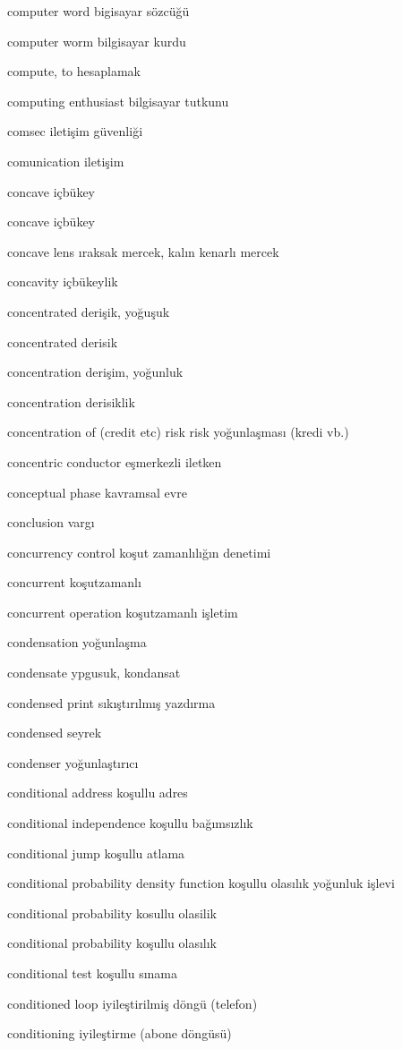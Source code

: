 \documentclass[12pt,fleqn]{article}\usepackage{../../common}
\begin{document}
computer word bigisayar sözcüğü

computer worm bilgisayar kurdu

compute, to hesaplamak

computing enthusiast bilgisayar tutkunu

comsec iletişim güvenliği

comunication iletişim

concave içbükey

concave içbükey

concave lens ıraksak mercek, kalın kenarlı mercek

concavity içbükeylik

concentrated derişik, yoğuşuk

concentrated derisik

concentration derişim, yoğunluk

concentration derisiklik

concentration of (credit etc) risk risk yoğunlaşması (kredi vb.)

concentric conductor eşmerkezli iletken

conceptual phase kavramsal evre

conclusion vargı

concurrency control koşut zamanlılığın denetimi

concurrent koşutzamanlı

concurrent operation koşutzamanlı işletim

condensation yoğunlaşma

condensate ypgusuk, kondansat

condensed print sıkıştırılmış yazdırma

condensed seyrek

condenser yoğunlaştırıcı

conditional address koşullu adres

conditional independence koşullu bağımsızlık

conditional jump koşullu atlama

conditional probability density function koşullu olasılık yoğunluk işlevi

conditional probability kosullu olasilik

conditional probability koşullu olasılık

conditional test koşullu sınama

conditioned loop iyileştirilmiş döngü (telefon)

conditioning iyileştirme (abone döngüsü)
\end{document}
